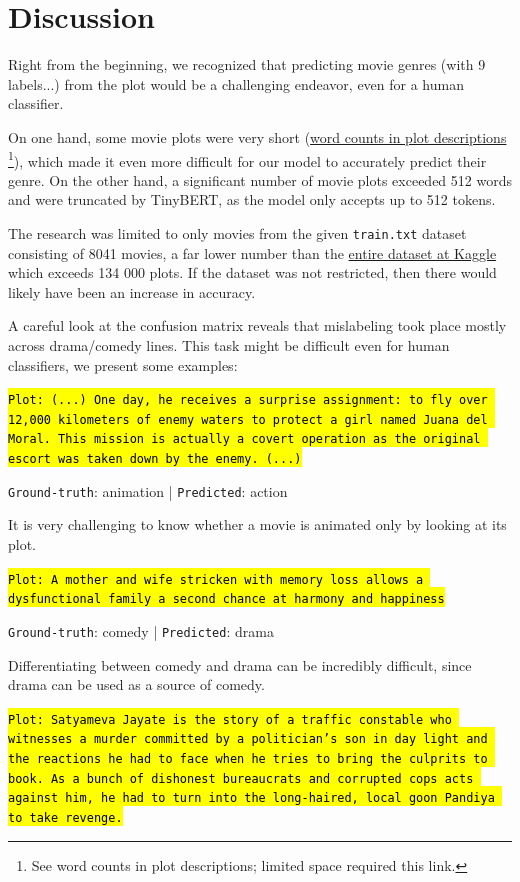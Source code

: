\documentclass[twocolumn]{article}
\begin{document}
\section{Discussion}
\label{sec:discussion}
\vspace{-0.2cm}
Right from the beginning, we recognized that predicting movie genres (with 9 labels...) from the plot would be a challenging endeavor, even for a human classifier. 

On one hand, some movie plots were very short (\href{https://ibb.co/JQfxGBx}{word counts in plot descriptions} \footnote{See word counts in plot descriptions; limited space required this link.}), which made it even more difficult for our model to accurately predict their genre. On the other hand, a significant number of movie plots exceeded 512 words and were truncated by TinyBERT, as the model only accepts up to 512 tokens.
 

The research was limited to only movies from the given \texttt{train.txt} dataset consisting of 8041 movies, a far lower number than the \href{https://www.kaggle.com/datasets/jrobischon/wikipedia-movie-plots}{entire dataset at Kaggle} which exceeds 134 000 plots. If the dataset was not restricted, then there would likely have been an increase in accuracy.

 A careful look at the confusion matrix reveals
that mislabeling took place mostly across drama/comedy lines. This task might be difficult even for human classifiers, we present some examples:

\hl{\texttt{Plot: (...) One day, he receives a surprise assignment: to fly over 12,000 kilometers of enemy waters to protect a girl named Juana del Moral. This mission is actually a covert operation as the original escort was taken down by the enemy. (...)}}

\texttt{Ground-truth}: animation | \texttt{Predicted}: action

It is very challenging to know whether a movie is animated only by looking at its plot.

\hl{\texttt{Plot: A mother and wife stricken with memory loss allows a dysfunctional family a second chance at harmony and happiness}}

\texttt{Ground-truth}: comedy | \texttt{Predicted}: drama

Differentiating between comedy and drama can be incredibly difficult, since drama can be used as a source of comedy.

\hl{\texttt{Plot: Satyameva Jayate is the story of a traffic constable who witnesses a murder committed by a politician’s son in day light and the reactions he had to face when he tries to bring the culprits to book. As a bunch of dishonest bureaucrats and corrupted cops acts against him, he had to turn into the long-haired, local goon Pandiya to take revenge.}}
\end{document}
